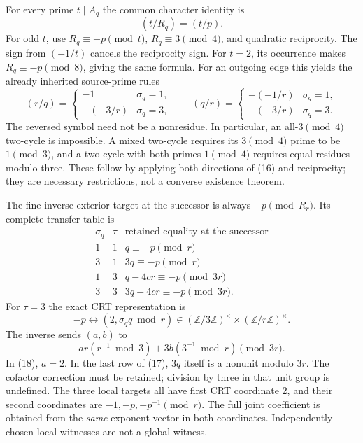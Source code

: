 For every prime $t\mid A_q$ the common character identity is
\[
 \boxed{(t/R_q)=(t/p).}                                  \tag{15}
\]
For odd $t$, use $R_q\equiv-p\pmod t$, $R_q\equiv3\pmod4$,
and quadratic reciprocity. The sign from $(-1/t)$ cancels the reciprocity sign.
For $t=2$, its occurrence makes $R_q\equiv-p\pmod8$, giving the same formula.
For an outgoing edge this yields the already inherited source-prime rules
\[
 (r/q)=\begin{cases}-1&\sigma_q=1,\\-(-3/r)&\sigma_q=3,\end{cases}
 \qquad
 (q/r)=\begin{cases}-(-1/r)&\sigma_q=1,\\-(-3/r)&\sigma_q=3.
 \end{cases}                                               \tag{16}
\]
The reversed symbol need not be a nonresidue. In particular, an all-$3\pmod4$
two-cycle is impossible. A mixed two-cycle requires its $3\pmod4$ prime to be
$1\pmod3$, and a two-cycle with both primes $1\pmod4$ requires equal residues
modulo three. These follow by applying both directions of (16) and reciprocity;
they are necessary restrictions, not a converse existence theorem.

The fine inverse-exterior target at the successor is always $-p\pmod{R_r}$.
Its complete transfer table is
\[
\begin{array}{c|c|l}
 \sigma_q&\tau&\text{retained equality at the successor}\\\hline
1&1&q\equiv-p\pmod r\\
3&1&3q\equiv-p\pmod r\\
1&3&q-4cr\equiv-p\pmod{3r}\\
3&3&3q-4cr\equiv-p\pmod{3r}.
\end{array}                                                \tag{17}
\]
For $\tau=3$ the exact CRT representation is
\[
 \boxed{-p\longleftrightarrow(2,\sigma_q q\bmod r)
 \in(\mathbb Z/3\mathbb Z)^\times\times(\mathbb Z/r\mathbb Z)^\times.}
                                                               \tag{18}
\]
The inverse sends $(a,b)$ to
\[
 a r(r^{-1}\bmod3)+3b(3^{-1}\bmod r)\pmod{3r}.
\]
In (18), $a=2$. In the last row of (17), $3q$ itself is a nonunit modulo
$3r$. The cofactor correction must be retained; division by three in that
unit group is undefined. The three local targets all have first CRT coordinate
2, and their second coordinates are $-1,-p,-p^{-1}\pmod r$. The full joint
coefficient is obtained from the \emph{same} exponent vector in both coordinates.
Independently chosen local witnesses are not a global witness.

